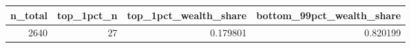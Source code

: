 \begin{tabular}{rrrr}
\toprule
n\_total & top\_1pct\_n & top\_1pct\_wealth\_share & bottom\_99pct\_wealth\_share \\
\midrule
2640 & 27 & 0.179801 & 0.820199 \\
\bottomrule
\end{tabular}
